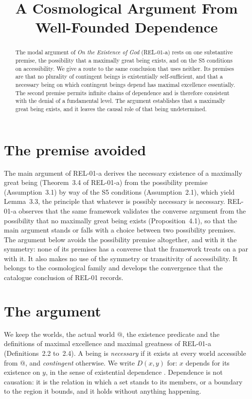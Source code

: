 \documentclass{situationist-preprint}
\title{A Cosmological Argument From Well-Founded Dependence}
\begin{document}
\maketitle

\begin{abstract}
The modal argument of \emph{On the Existence of God} (REL-01-a) rests on one substantive premise, the possibility that a maximally great being exists, and on the S5 conditions on accessibility. We give a route to the same conclusion that uses neither. Its premises are that no plurality of contingent beings is existentially self-sufficient, and that a necessary being on which contingent beings depend has maximal excellence essentially. The second premise permits infinite chains of dependence and is therefore consistent with the denial of a fundamental level. The argument establishes that a maximally great being exists, and it leaves the causal role of that being undetermined.
\end{abstract}

\section{The premise avoided}

The main argument of REL-01-a derives the necessary existence of a maximally great being (Theorem~3.4 of REL-01-a) from the possibility premise (Assumption~3.1) by way of the S5 conditions (Assumption~2.1), which yield Lemma~3.3, the principle that whatever is possibly necessary is necessary. REL-01-a observes that the same framework validates the converse argument from the possibility that no maximally great being exists (Proposition~4.1), so that the main argument stands or falls with a choice between two possibility premises. The argument below avoids the possibility premise altogether, and with it the symmetry: none of its premises has a converse that the framework treats on a par with it. It also makes no use of the symmetry or transitivity of accessibility. It belongs to the cosmological family \citep{Rowe1975, Pruss2006} and develops the convergence that the catalogue conclusion of REL-01 records.

\section{The argument}

We keep the worlds, the actual world $@$, the existence predicate and the definitions of maximal excellence and maximal greatness of REL-01-a (Definitions~2.2 to~2.4). A being is \emph{necessary} if it exists at every world accessible from $@$, and \emph{contingent} otherwise. We write $D(x,y)$ for: $x$ depends for its existence on $y$, in the sense of existential dependence \citep{Fine2010}. Dependence is not causation: it is the relation in which a set stands to its members, or a boundary to the region it bounds, and it holds without anything happening.
\end{document}
